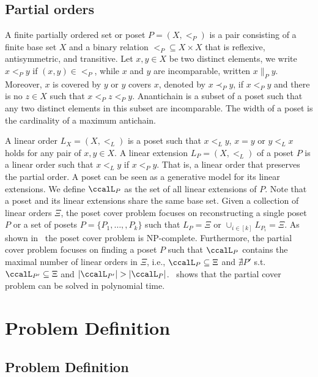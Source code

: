 \documentclass[Afour,sageh,times]{sagej}
\begin{document}
\subsection{Partial orders}\label{sec:partial}
A finite partially ordered set or poset $P = (X, <_P )$  is a pair consisting of a finite base set $X$ and a binary relation $<_P \subseteq X \times X$ that is reflexive, antisymmetric, and transitive. Let  $x, y \in X$ be two distinct elements, we write $x <_P y$ if $(x,y) \in <_P$, while $x$ and $y$ are incomparable, written $x \|_P y$. Moreover, $x$ is covered by $y$ or $y$ covers $x$, denoted by $x \prec_P y$, if $x<_P  y$ and there is no $z \in X$ such that $x  <_P  z <_P y$. Anantichain is a subset of a poset such that any two distinct elements in this subset are incomparable. The width of a poset is the cardinality of a maximum antichain. %

A linear order $L_X=(X, <_L)$ is a poset such that $x <_L y$, $x = y$ or $y <_L x$ holds for any pair of  $x, y \in X$. A linear extension  $L_P = (X, <_L)$ of a poset $P$ is a linear order such that $x <_L y$ if $x <_P y$. That is, a linear order that preserves the partial order. A poset can be seen as a generative model for its linear extensions.
We define $\ccalL_P$ as the set of all linear extensions of $P$. Note that a poset and its linear extensions share the same base set. Given a collection of linear orders $\Xi$, the poset cover problem focuses on reconstructing a single poset $P$ or a set of posets $P = \{P_1,\ldots,,P_k\}$ such that $L_P = \Xi$ or $\cup_{i\in[k]}L_{P_i} = \Xi$. As shown in~\cite{heath2013poset} the poset cover problem is NP-complete. Furthermore, the partial cover problem focuses on finding a poset $P$ such that $\ccalL_P$ contains the maximal number of linear orders in $\Xi$, i.e., $\ccalL_P \subseteq \Xi$ and   $\nexists P'$ s.t. $\ccalL_{P'} \subseteq \Xi$ and $|\ccalL_{P'}| > |\ccalL_{P}|$.~\cite{heath2013poset} shows that the partial cover problem can be solved in polynomial time.

\section{Problem Definition}\label{sec:problem}
 \subsection{Problem Definition}
\end{document}
